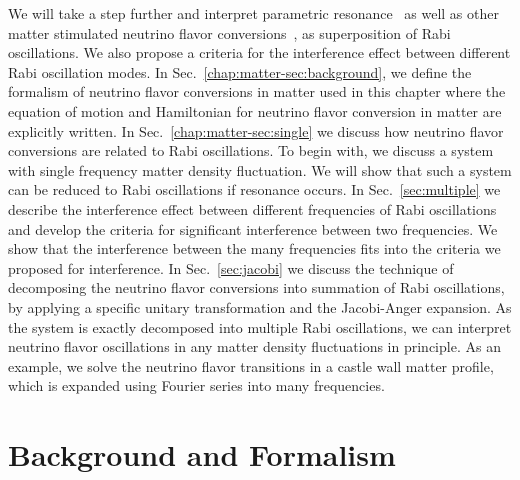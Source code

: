 We will take a step further and interpret parametric resonance~\cite{Akhmedov2000, Krastev1989} as well as other matter stimulated neutrino flavor conversions~\cite{Kneller2013, Patton2014}, as superposition of Rabi oscillations. We also propose a criteria for the interference effect between different Rabi oscillation modes. In Sec.~\ref{chap:matter-sec:background}, we define the formalism of neutrino flavor conversions in matter used in this chapter where the equation of motion and Hamiltonian for neutrino flavor conversion in matter are explicitly written. In Sec.~\ref{chap:matter-sec:single} we discuss how neutrino flavor conversions are related to Rabi oscillations. To begin with, we discuss a system with single frequency matter density fluctuation. We will show that such a system can be reduced to Rabi oscillations if resonance occurs. In Sec.~\ref{sec:multiple} we describe the interference effect between different frequencies of Rabi oscillations and develop the criteria for significant interference between two frequencies. We show that the interference between the many frequencies fits into the criteria we proposed for interference. In Sec.~\ref{sec:jacobi} we discuss the technique of decomposing the neutrino flavor conversions into summation of Rabi oscillations, by applying a specific unitary transformation and the Jacobi-Anger expansion. As the system is exactly decomposed into multiple Rabi oscillations, we can interpret neutrino flavor oscillations in any matter density fluctuations in principle. As an example, we solve the neutrino flavor transitions in a castle wall matter profile, which is expanded using Fourier series into many frequencies.



\section{\label{chap:matter-sec:background}Background and Formalism}


